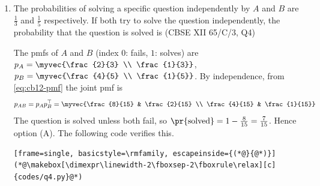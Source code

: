 \begin{enumerate}[label=\thesubsection.\arabic*, ref=\thesubsection.\theenumi,itemsep=0pt]
\solution In the form $\vec{n}^{\top}\vec{x} = c$: $\vec{n}_1 = \myvec{4 \\ -4 \\ 2}$, $c_1 = -5$ and $\vec{n}_2 = \myvec{2 \\ -2 \\ 1}$, $c_2 = -6$. Since $\vec{n}_1 = 2\vec{n}_2$ the planes are parallel. From \eqref{eq:cb12-planes} with $\lambda = 2$,
\begin{align}
d = \frac{\abs{-5 - 2\brak{-6}}}{\norm{\vec{n}_1}} = \frac{7}{\sqrt{16+16+4}} = \frac{7}{6}
\end{align}
Hence option (B). The following code verifies this.
\begin{lstlisting}[frame=single, basicstyle=\rmfamily, escapeinside={(*@}{@*)}]
(*@\makebox[\dimexpr\linewidth-2\fboxsep-2\fboxrule\relax][c]{codes/q3.py}@*)
\end{lstlisting}

\item The probabilities of solving a specific question independently by $A$ and $B$ are $\frac{1}{3}$ and $\frac{1}{5}$ respectively. If both try to solve the question independently, the probability that the question is solved is
\hfill (CBSE XII 65/C/3, Q4)
\begin{enumerate}[itemsep=0pt]
\end{enumerate}

\solution The pmfs of $A$ and $B$ (index $0$: fails, $1$: solves) are $p_A = \myvec{\frac{2}{3} \\ \frac{1}{3}}$, $p_B = \myvec{\frac{4}{5} \\ \frac{1}{5}}$. By independence, from \eqref{eq:cb12-pmf} the joint pmf is
\begin{align}
p_{AB} = p_Ap_B^{\top} = \myvec{\frac{8}{15} & \frac{2}{15} \\ \frac{4}{15} & \frac{1}{15}}
\end{align}
The question is solved unless both fail, so $\pr{\text{solved}} = 1 - \frac{8}{15} = \frac{7}{15}$. Hence option (A). The following code verifies this.
\begin{lstlisting}[frame=single, basicstyle=\rmfamily, escapeinside={(*@}{@*)}]
(*@\makebox[\dimexpr\linewidth-2\fboxsep-2\fboxrule\relax][c]{codes/q4.py}@*)
\end{lstlisting}


\end{enumerate}

